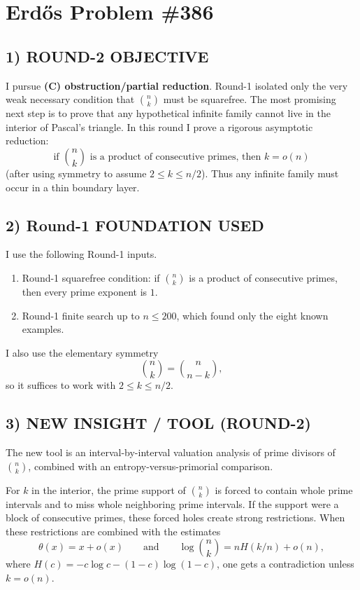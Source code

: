 \section*{Erd\H{o}s Problem \#386}

\subsection*{1) ROUND-2 OBJECTIVE}
I pursue \textbf{(C) obstruction/partial reduction}. Round-1 isolated only the very weak necessary condition that $\binom{n}{k}$ must be squarefree. The most promising next step is to prove that any hypothetical infinite family cannot live in the interior of Pascal's triangle. In this round I prove a rigorous asymptotic reduction:
\[
\text{if } \binom{n}{k}\text{ is a product of consecutive primes, then } k=o(n)
\]
(after using symmetry to assume $2\leq k\leq n/2$). Thus any infinite family must occur in a thin boundary layer.

\subsection*{2) Round-1 FOUNDATION USED}
I use the following Round-1 inputs.

\begin{enumerate}
\item Round-1 squarefree condition: if $\binom{n}{k}$ is a product of consecutive primes, then every prime exponent is $1$.
\item Round-1 finite search up to $n\leq 200$, which found only the eight known examples.
\end{enumerate}

I also use the elementary symmetry
\[
\binom{n}{k}=\binom{n}{n-k},
\]
so it suffices to work with $2\leq k\leq n/2$.

\subsection*{3) NEW INSIGHT / TOOL (ROUND-2)}
The new tool is an interval-by-interval valuation analysis of prime divisors of $\binom{n}{k}$, combined with an entropy-versus-primorial comparison.

For $k$ in the interior, the prime support of $\binom{n}{k}$ is forced to contain whole prime intervals and to miss whole neighboring prime intervals. If the support were a block of consecutive primes, these forced holes create strong restrictions. When these restrictions are combined with the estimates
\[
\theta(x)=x+o(x)
\qquad\text{and}\qquad
\log\binom{n}{k}=nH(k/n)+o(n),
\]
where $H(c)=-c\log c-(1-c)\log(1-c)$, one gets a contradiction unless $k=o(n)$.

